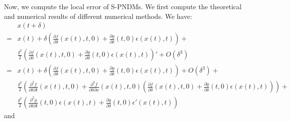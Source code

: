 \documentclass{article}
\begin{document}
Now, we compute the local error of S-PNDMs. We first compute the theoretical and numerical results of different numerical methods. We have:
\begin{equation}
   \begin{split}
           &x(t+\delta) \\
           =& x(t) + \delta\left(\frac{\partial f}{\partial \delta}(x(t),t,0)+\frac{\partial g}{\partial \delta}(t,0)\epsilon(x(t),t)\right) + \\
               & \frac{\delta^2}{2}\left(\frac{\partial f}{\partial \delta}(x(t),t,0)+\frac{\partial g}{\partial \delta}(t,0)\epsilon(x(t),t)\right)' + O(\delta^3) \\
           =& x(t) + \delta\left(\frac{\partial f}{\partial \delta}(x(t),t,0)+\frac{\partial g}{\partial \delta}(t,0)\epsilon(x(t),t)\right) + O(\delta^3) + \\
           & \frac{\delta^2}{2}\left(\frac{\partial^2 f}{\partial \delta\partial t}(x(t),t,0)+\frac{\partial^2 f}{\partial \delta\partial x}(x(t),t,0)\left(\frac{\partial f}{\partial \delta}(x(t),t,0)+\frac{\partial g}{\partial \delta}(t,0)\epsilon(x(t),t)\right) \right) + \\
           & \frac{\delta^2}{2} \left( \frac{\partial^2 g}{\partial \delta\partial t}(t,0)\epsilon(x(t),t) + \frac{\partial g}{\partial \delta}(t,0)\epsilon'(x(t),t)\right)     
   \end{split}
\end{equation}
and
\end{document}
